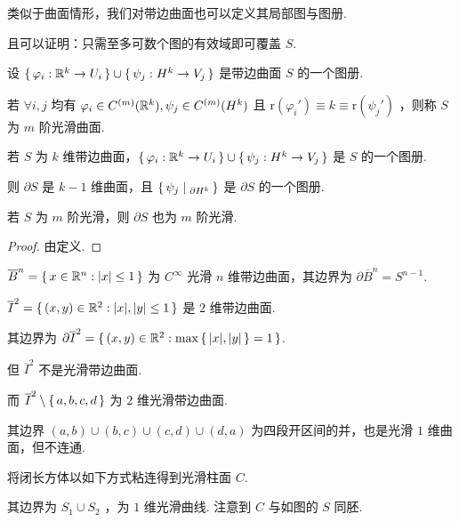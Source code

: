 类似于曲面情形，我们对带边曲面也可以定义其局部图与图册.

且可以证明：只需至多可数个图的有效域即可覆盖 $S$.

\begin{definition}
设 $\set{\varphi_i:\mathbb{R}^k\to U_i}\cup\set{\psi_j:H^k\to V_j}$ 是带边曲面 $S$ 的一个图册.

若 $\forall i,j$ 均有 $\varphi_i\in C^{(m)}(\mathbb{R}^k),\psi_j\in C^{(m)}(H^k)$ 且 $\mathrm{r}(\varphi_i')\equiv k\equiv\mathrm{r}(\psi_j')$ ，则称 $S$ 为 $m$ 阶光滑曲面.
\end{definition}

\begin{property}
若 $S$ 为 $k$ 维带边曲面，$\set{\varphi_i:\mathbb{R}^k\to U_i}\cup\set{\psi_j:H^k\to V_j}$ 是 $S$ 的一个图册.

则 $\partial S$ 是 $k-1$ 维曲面，且 $\set{\psi_j|_{\partial H^k}}$ 是 $\partial S$ 的一个图册.

若 $S$ 为 $m$ 阶光滑，则 $\partial S$ 也为 $m$ 阶光滑.
\end{property}
\begin{proof}
    由定义.
\end{proof}

\begin{example}
    $\overline{B}^n=\set{x\in\mathbb{R}^n:\lvert{x}\rvert\le 1}$ 为 $C^{\infty}$ 光滑 $n$ 维带边曲面，其边界为 $\partial\overline{B}^n=S^{n-1}$.
\end{example}

\begin{example}
    $\overline{I}^2=\set{(x,y)\in\mathbb{R}^2:\lvert{x}\rvert,\lvert{y}\rvert\le 1}$ 是 $2$ 维带边曲面.
    
    其边界为 $\partial\overline{I}^2=\set{(x,y)\in\mathbb{R}^2:\max\set{\lvert{x}\rvert,\lvert{y}\rvert}=1}$.

    但 $\overline{I}^2$ 不是光滑带边曲面.


    而 $\overline{I}^2\setminus\set{a,b,c,d}$ 为 $2$ 维光滑带边曲面.

    其边界 $(a,b)\cup(b,c)\cup(c,d)\cup(d,a)$ 为四段开区间的并，也是光滑 $1$ 维曲面，但不连通.
\end{example}

\begin{example}
    将闭长方体以如下方式粘连得到光滑柱面 $C$.


    其边界为 $S_1\cup S_2$ ，为 $1$ 维光滑曲线. 注意到 $C$ 与如图的 $S$ 同胚.
\end{example}

